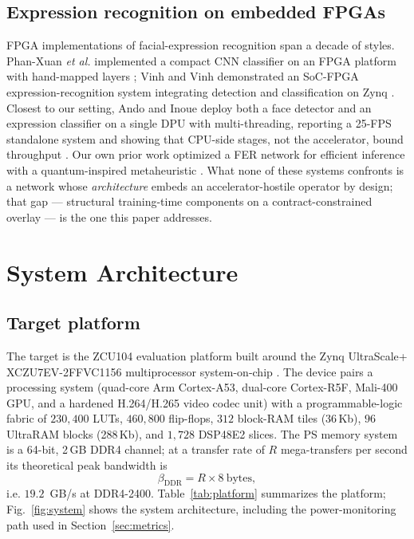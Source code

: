 \documentclass[onecolumn,journal]{IEEEtran}
\begin{document}
\subsection{Expression recognition on embedded FPGAs}
FPGA implementations of facial-expression recognition span a decade of styles.
Phan-Xuan \textit{et al.} implemented a compact CNN classifier on an FPGA platform with
hand-mapped layers \cite{phanxuan2019fpga}; Vinh and Vinh demonstrated an SoC-FPGA
expression-recognition system integrating detection and classification on Zynq
\cite{vinh2019soc}. Closest to our setting, Ando and Inoue deploy both a face detector
and an expression classifier on a single DPU with multi-threading, reporting a 25-FPS
standalone system and showing that CPU-side stages, not the accelerator, bound
throughput \cite{ando2025fer}. Our own prior work optimized a FER network for efficient
inference with a quantum-inspired metaheuristic \cite{askri2024qgoa}. What none of these
systems confronts is a network whose \emph{architecture} embeds an accelerator-hostile
operator by design; that gap --- structural training-time components on a
contract-constrained overlay --- is the one this paper addresses.

\section{System Architecture}\label{sec:arch}

\subsection{Target platform}
The target is the ZCU104 evaluation platform built around the Zynq UltraScale+
XCZU7EV-2FFVC1156 multiprocessor system-on-chip \cite{amd_ug1267}. The device pairs a
processing system (quad-core Arm Cortex-A53, dual-core Cortex-R5F, Mali-400 GPU, and a
hardened H.264/H.265 video codec unit) with a programmable-logic fabric of
$230{,}400$ LUTs, $460{,}800$ flip-flops, $312$ block-RAM tiles (36\,Kb),
$96$ UltraRAM blocks (288\,Kb), and $1{,}728$ DSP48E2 slices. The PS memory system is a
64-bit, 2\,GB DDR4 channel; at a transfer rate of $R$ mega-transfers per second its
theoretical peak bandwidth is
\begin{equation}
\beta_{\mathrm{DDR}} = R \times 8~\text{bytes} ,
\label{eq:bw}
\end{equation}
i.e. $19.2$~GB/s at DDR4-2400. Table~\ref{tab:platform} summarizes the platform;
Fig.~\ref{fig:system} shows the system architecture, including the power-monitoring
path used in Section~\ref{sec:metrics}.
\end{document}
